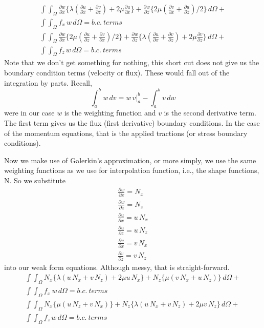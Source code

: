 \documentclass{article}
\begin{document}
\begin{eqnarray}
\int\int _{\Omega} \frac{\partial w}{\partial x} \{ 
\lambda ( \frac{\partial u}{\partial x} + \frac{\partial v}{\partial z})  
+ 2 \mu \frac{\partial u}{\partial x} \}+
\frac{\partial w}{\partial z} \{ 2 \mu (\frac{\partial v}{\partial x} +
\frac{\partial u}{\partial z} )/2 \} \, d\Omega + \nonumber \\
\int\int _{\Omega} f_x \, w \, d\Omega = b.c.~terms \\
\int\int _{\Omega} \frac{\partial w}{\partial x} \{  
2 \mu (\frac{\partial u}{\partial z} + \frac{\partial v}{\partial x} )/2  \}+
\frac{\partial w}{\partial z} \{
\lambda ( \frac{\partial u}{\partial x} + \frac{\partial v}{\partial z} ) + 
2 \mu \frac{\partial v}{\partial z} \} \, d\Omega + \nonumber \\
\int\int _{\Omega} f_z \, w \, d\Omega = b.c.~terms
\end{eqnarray}
Note that we don't get something for nothing, this short cut does not give us
the boundary condition terms (velocity or flux).  These would fall out of the
integration by parts.  Recall,
\begin{equation}
\int _a ^b w \, dv = w\, v | _a ^b - \int _a ^b v \, dw
\end{equation}
were in our case $w$ is the weighting function and $v$ is the second derivative
term.  The first term gives us the flux (first derivative) boundary
conditions.  In the case of the momentum equations, that is the applied
tractions (or stress boundary conditions).

Now we make use of Galerkin's approximation, or more simply, we use the same
weighting functions as we use for interpolation function, i.e., the shape
functions, N.  So we substitute
\begin{eqnarray}
\frac{\partial w}{\partial x} = N_x \\
\frac{\partial w}{\partial z} = N_z \\
\frac{\partial u}{\partial x} = u\, N_x \\
\frac{\partial u}{\partial z} = u\, N_z \\
\frac{\partial v}{\partial x} = v\, N_x \\
\frac{\partial v}{\partial z} = v\, N_z 
\end{eqnarray}
into our weak form equations.   Although messy, that is straight-forward.
\begin{eqnarray}
\int\int _{\Omega} N_x \{ 
\lambda ( u\, N_x + v\, N_z)  + 2 \mu u\, N_x \} +
N_z \{ \mu ( v\, N_x + u\, N_z ) \} \, d\Omega + \nonumber \\
\int\int _{\Omega} f_x \, w \, d\Omega = b.c.~terms \\
\int\int _{\Omega} N_x \{    \mu ( u\, N_z + v\, N_x ) \}+
N_z \{ \lambda ( u\, N_x + v\, N_z ) +  
2 \mu v\, N_z \} \, d\Omega + \nonumber \\
\int\int _{\Omega} f_z \, w \, d\Omega = b.c.~terms
\end{eqnarray}
\end{document}
